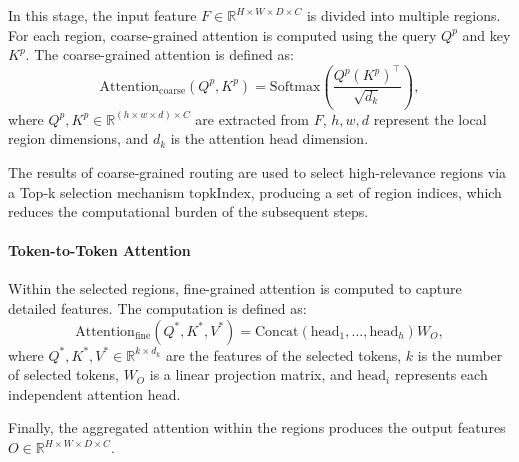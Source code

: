 In this stage, the input feature \( F \in \mathbb{R}^{H \times W \times D \times C} \) is divided into multiple regions. For each region, coarse-grained attention is computed using the query \( Q^p \) and key \( K^p \). The coarse-grained attention is defined as:
\begin{equation}
\text{Attention}_{\text{coarse}}(Q^p, K^p) = \text{Softmax}\left( \frac{Q^p (K^p)^\top}{\sqrt{d_k}} \right),
\end{equation}
where \( Q^p, K^p\in \mathbb{R}^{(h \times w \times d) \times C} \) are extracted from \( F \), \( h, w, d \) represent the local region dimensions, and \( d_k \) is the attention head dimension.

The results of coarse-grained routing are used to select high-relevance regions via a Top-k selection mechanism \textbf{\( \text{topkIndex} \)}, producing a set of region indices, which reduces the computational burden of the subsequent steps.

\paragraph{Token-to-Token Attention}

Within the selected regions, fine-grained attention is computed to capture detailed features. The computation is defined as:
\begin{equation}
\text{Attention}_{\text{fine}}(Q^*, K^*, V^*) = \text{Concat}(\text{head}_1, \ldots, \text{head}_h) W_O,
\end{equation}
where \( Q^*, K^*, V^* \in \mathbb{R}^{k \times d_k} \) are the features of the selected tokens, \( k \) is the number of selected tokens, \( W_O \) is a linear projection matrix, and \( \text{head}_i \) represents each independent attention head.

Finally, the aggregated attention within the regions produces the output features \( O \in \mathbb{R}^{H \times W \times D \times C} \).




